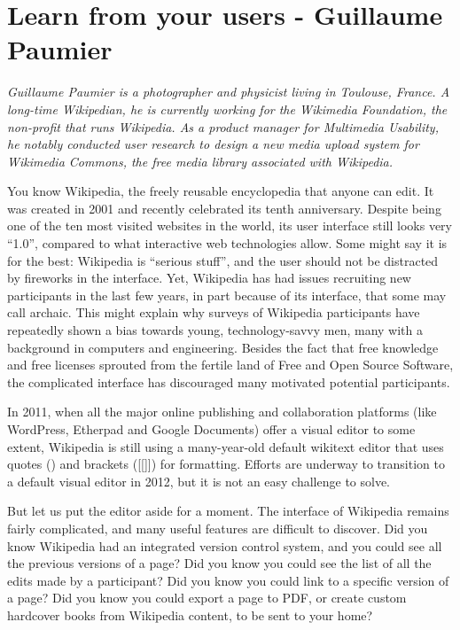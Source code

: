\chapter{Learn from your users - Guillaume Paumier}

\textit{Guillaume Paumier is a photographer and physicist living in Toulouse,
France. A long-time Wikipedian, he is currently working for the Wikimedia
Foundation, the non-profit that runs Wikipedia. As a product manager for
Multimedia Usability, he notably conducted user research to design a new media
upload system for Wikimedia Commons, the free media library associated with
Wikipedia.}

You know Wikipedia, the freely reusable encyclopedia that anyone can edit. It
was created in 2001 and recently celebrated its tenth anniversary. Despite being
one of the ten most visited websites in the world, its user interface still
looks very ``1.0'', compared to what interactive web technologies allow. Some
might say it is for the best: Wikipedia is ``serious stuff'', and the user
should not be distracted by fireworks in the interface. Yet, Wikipedia has had
issues recruiting new participants in the last few years, in part because of its
interface, that some may call archaic. This might explain why surveys of
Wikipedia participants have repeatedly shown a bias towards young,
technology-savvy men, many with a background in computers and engineering.
Besides the fact that free knowledge and free licenses sprouted from the fertile
land of Free and Open Source Software, the complicated interface has discouraged
many motivated potential participants.

In 2011, when all the major online publishing and collaboration platforms (like
WordPress, Etherpad and Google Documents) offer a visual editor to some extent,
Wikipedia is still using a many-year-old default wikitext editor that uses
quotes (\textquotesingle \textquotesingle \textquotesingle \textquotesingle) and
brackets ([[]]) for formatting. Efforts are underway to transition to a default
visual editor in 2012, but it is not an easy challenge to solve.

But let us put the editor aside for a moment. The interface of Wikipedia remains
fairly complicated, and many useful features are difficult to discover. Did you
know Wikipedia had an integrated version control system, and you could see all
the previous versions of a page? Did you know you could see the list of all the
edits made by a participant? Did you know you could link to a specific version
of a page? Did you know you could export a page to PDF, or create custom
hardcover books from Wikipedia content, to be sent to your home?

